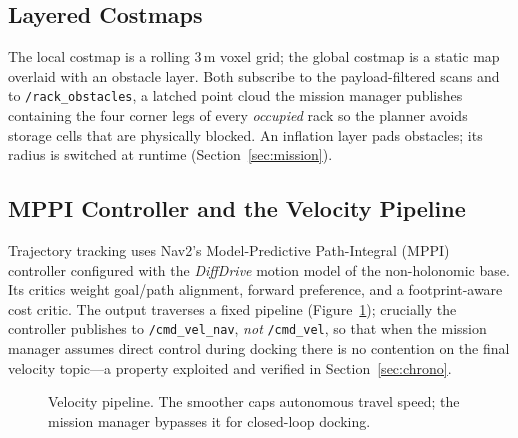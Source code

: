 \documentclass[11pt,a4paper]{article}
\newcommand{\code}[1]{\texttt{\small #1}}
\begin{document}
\subsection{Layered Costmaps}
The local costmap is a rolling 3\,m voxel grid; the global costmap is a static
map overlaid with an obstacle layer. Both subscribe to the payload-filtered
scans and to \code{/rack\_obstacles}, a latched point cloud the mission manager
publishes containing the four corner legs of every \emph{occupied} rack so
the planner avoids storage cells that are physically blocked. An inflation
layer pads obstacles; its radius is switched at runtime
(Section~\ref{sec:mission}).

\subsection{MPPI Controller and the Velocity Pipeline}
Trajectory tracking uses Nav2's Model-Predictive Path-Integral (MPPI)
controller configured with the \emph{DiffDrive} motion model of the
non-holonomic base. Its critics weight goal/path alignment, forward preference,
and a footprint-aware cost critic. The output traverses a fixed pipeline
(Figure~\ref{fig:vel}); crucially the controller publishes to
\code{/cmd\_vel\_nav}, \emph{not} \code{/cmd\_vel}, so that when the mission
manager assumes direct control during docking there is no contention on the
final velocity topic---a property exploited and verified in
Section~\ref{sec:chrono}.

\begin{figure}[h]\centering
{}
\caption{Velocity pipeline. The smoother caps autonomous travel speed; the
mission manager bypasses it for closed-loop docking.}\label{fig:vel}
\end{figure}
\end{document}
